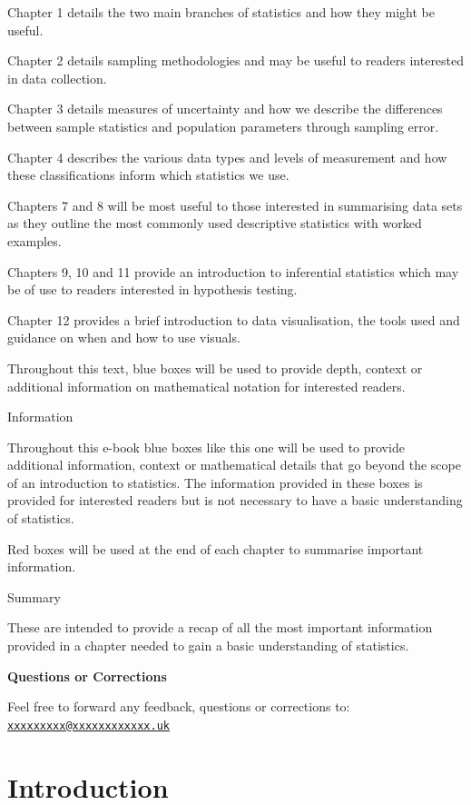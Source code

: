 \documentclass[
]{book}
\begin{document}
Chapter 1 details the two main branches of statistics and how they might be useful.

Chapter 2 details sampling methodologies and may be useful to readers interested in data collection.

Chapter 3 details measures of uncertainty and how we describe the differences between sample statistics and population parameters through sampling error.

Chapter 4 describes the various data types and levels of measurement and how these classifications inform which statistics we use.

Chapters 7 and 8 will be most useful to those interested in summarising data sets as they outline the most commonly used descriptive statistics with worked examples.

Chapters 9, 10 and 11 provide an introduction to inferential statistics which may be of use to readers interested in hypothesis testing.

Chapter 12 provides a brief introduction to data visualisation, the tools used and guidance on when and how to use visuals.

Throughout this text, blue boxes will be used to provide depth, context or additional information on mathematical notation for interested readers.

Information

Throughout this e-book blue boxes like this one will be used to provide additional information, context or mathematical details that go beyond the scope of an introduction to statistics. The information provided in these boxes is provided for interested readers but is not necessary to have a basic understanding of statistics.

Red boxes will be used at the end of each chapter to summarise important information.

Summary

These are intended to provide a recap of all the most important information provided in a chapter needed to gain a basic understanding of statistics.

\textbf{Questions or Corrections}

Feel free to forward any feedback, questions or corrections to: \href{mailto:xxxxxxxxx@xxxxxxxxxxxx.uk}{\nolinkurl{xxxxxxxxx@xxxxxxxxxxxx.uk}}

\hypertarget{intro}{%
\chapter{Introduction}\label{intro}}
\end{document}
